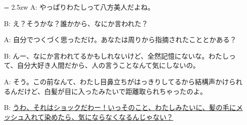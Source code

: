 \documentclass[11pt]{amsart}
\title{}
\author{}
\newenvironment{hangall}[1]{\hangindent = 2.5zw\everypar{\hangindent = 2.5zw}}{}
\begin{document}
\maketitle
\begin{hangall}{}%
A: やっぱりわたしって八方美人だよね。

B: え？そうかな？誰かから、なにか言われた？

A: 自分でつくづく思っただけ。あなたは周りから指摘されたこととかある？

B: んー、なにか言われてるかもしれないけど、全然記憶にないな。わたしって、自分大好き人間だから、人の言うことなんて気にしないの。

A: そう。この前なんて、わたし目鼻立ちがはっきりしてるから結構声かけられるんだけど、白髪が目に入ったみたいで距離取られちゃったのよ。

B: \ul{うわ、それはショックだわー！いっそのこと、わたしみたいに、髪の毛にメッシュ入れて染めたら、気にならなくなるんじゃない？}\end{hangall}
\end{document}
